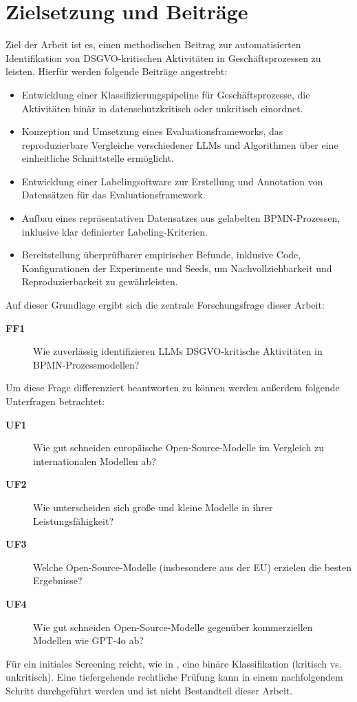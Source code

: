 \section{Zielsetzung und Beiträge}\label{sec:zielsetzung-und-beitrage}

Ziel der Arbeit ist es, einen methodischen Beitrag zur automatisierten Identifikation von \ac{DSGVO}-kritischen Aktivitäten in Geschäftsprozessen zu leisten. Hierfür werden folgende Beiträge angestrebt:

\begin{itemize}
    \item Entwicklung einer Klassifizierungspipeline für Geschäftsprozesse, die Aktivitäten binär in datenschutzkritisch oder unkritisch einordnet.
    \item Konzeption und Umsetzung eines Evaluationsframeworks, das reproduzierbare Vergleiche verschiedener \acp{LLM} und Algorithmen über eine einheitliche Schnittstelle ermöglicht.
    \item Entwicklung einer Labelingsoftware zur Erstellung und Annotation von Datensätzen für das Evaluationsframework.
    \item Aufbau eines repräsentativen Datensatzes aus gelabelten \ac{BPMN}-Prozessen, inklusive klar definierter Labeling-Kriterien.
    \item Bereitstellung überprüfbarer empirischer Befunde, inklusive Code, Konfigurationen der Experimente und Seeds, um Nachvollziehbarkeit und Reproduzierbarkeit zu gewährleisten.
\end{itemize}

Auf dieser Grundlage ergibt sich die zentrale Forschungsfrage dieser Arbeit:

\begin{description}
    \item[\textbf{FF1}] Wie zuverlässig identifizieren \acp{LLM} \ac{DSGVO}-kritische Aktivitäten in \ac{BPMN}-Prozessmodellen?
\end{description}

Um diese Frage differenziert beantworten zu können werden außerdem folgende Unterfragen betrachtet:

\begin{description}
    \item[\textbf{UF1}] Wie gut schneiden europäische Open-Source-Modelle im Vergleich zu internationalen Modellen ab?
    \item[\textbf{UF2}] Wie unterscheiden sich große und kleine Modelle in ihrer Leistungsfähigkeit?
    \item[\textbf{UF3}] Welche Open-Source-Modelle (insbesondere aus der EU) erzielen die besten Ergebnisse?
    \item[\textbf{UF4}] Wie gut schneiden Open-Source-Modelle gegenüber kommerziellen Modellen wie GPT-4o ab?
\end{description}

Für ein initiales Screening reicht, wie in \cite{nake2023towards}, eine binäre Klassifikation (kritisch vs. unkritisch). Eine tiefergehende rechtliche Prüfung kann in einem nachfolgendem Schritt durchgeführt werden und ist nicht Bestandteil dieser Arbeit.